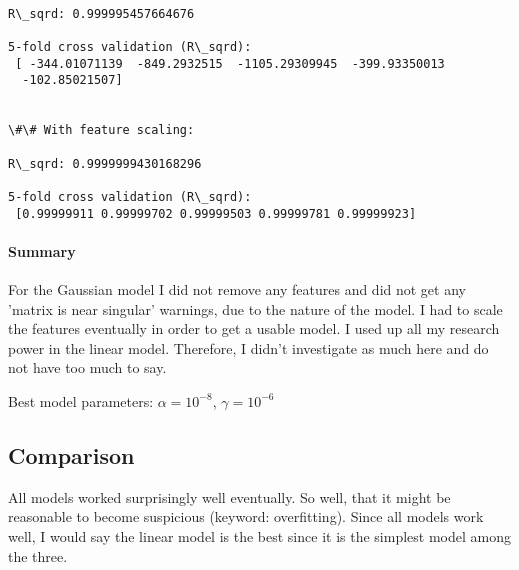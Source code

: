 \documentclass[11pt]{article}
\begin{document}
    \begin{Verbatim}[commandchars=\\\{\}]

R\_sqrd: 0.999995457664676

5-fold cross validation (R\_sqrd):
 [ -344.01071139  -849.2932515  -1105.29309945  -399.93350013
  -102.85021507]


\#\# With feature scaling:

R\_sqrd: 0.9999999430168296

5-fold cross validation (R\_sqrd):
 [0.99999911 0.99999702 0.99999503 0.99999781 0.99999923]

    \end{Verbatim}

    \paragraph{Summary}

For the Gaussian model I did not remove any features and did not get any
'matrix is near singular' warnings, due to the nature of the model. I
had to scale the features eventually in order to get a usable model. I
used up all my research power in the linear model. Therefore, I didn't
investigate as much here and do not have too much to say.\newline

Best model parameters: \(\alpha = 10^{-8}\), \(\gamma = 10^{-6}\)

    \subsection{Comparison}\label{comparison}

    All models worked surprisingly well eventually. So well, that it might
be reasonable to become suspicious (keyword: overfitting). Since all
models work well, I would say the linear model is the best since it is
the simplest model among the three.


    
    
    
    
\end{document}
